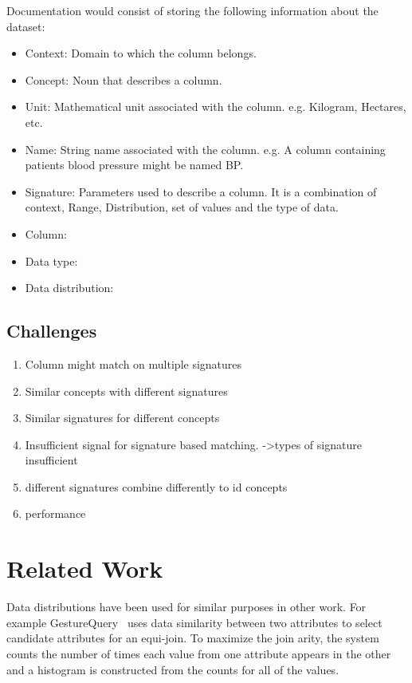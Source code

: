 \documentclass{vldb}
\begin{document}
Documentation would consist of storing the following information about the dataset:

\begin{itemize}
	\item Context: Domain to which the column belongs.
	\item Concept: Noun that describes a column.
	\item Unit: Mathematical unit associated with the column. e.g. Kilogram, Hectares, etc.
	\item Name: String name associated with the column. e.g. A column containing patients blood pressure might be named BP.
	\item Signature: Parameters used to describe a column. It is a combination of context, Range, Distribution, set of values and the type of data.
	\item Column: 
	\item Data type:
	\item Data distribution:
\end{itemize}

\subsection{Challenges}
\begin{enumerate}
	\item Column might match on multiple signatures
	\item Similar concepts with different signatures
	\item Similar signatures for different concepts
	\item Insufficient signal for signature based matching.
	->types of signature insufficient
	\item different signatures combine differently to id concepts
	\item performance
\end{enumerate}

\section{Related Work}
Data distributions have been used for similar purposes in other work.  
For example GestureQuery~\cite{nandi2013gestural} uses data similarity between two attributes to select candidate attributes for an equi-join.  
To maximize the join arity, the system counts the number of times each value from one attribute appears in the other and a histogram is constructed from the counts for all of the values.
\end{document}
